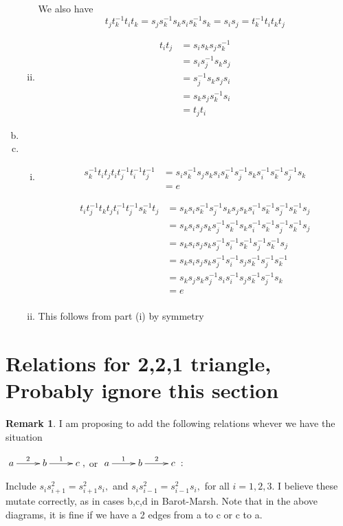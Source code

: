 \documentclass[11pt]{amsart}
\theoremstyle{definition}
\newtheorem{rem}[thm]{Remark}
\begin{document}
\begin{enumerate}[a)]
\begin{enumerate}[i)]
We also have
$$t_jt_k^{-1}t_it_k = s_js_k^{-1}s_ks_is_k^{-1}s_k = s_is_j = t_k^{-1}t_it_kt_j$$ 

\item
\begin{align*}
t_it_j &= s_is_ks_js_k^{-1}\\
&= s_is_j^{-1}s_ks_j\\
&= s_j^{-1}s_ks_js_i\\
&= s_ks_js_k^{-1}s_i\\
&= t_jt_i
\end{align*}
\end{enumerate}
\item
\item
\begin{enumerate}[i)]
\item
\begin{align*}
s_k^{-1}t_it_jt_it_j^{-1}t_i^{-1}t_j^{-1} &= s_is_k^{-1}s_js_ks_is_k^{-1}s_j^{-1}s_ks_i^{-1}s_k^{-1}s_j^{-1}s_k\\
&= e
\end{align*}

\begin{align*}
t_it_j^{-1}t_kt_jt_i^{-1}t_j^{-1}s_k^{-1}t_j &= s_ks_is_k^{-1}s_j^{-1}s_ks_js_ks_i^{-1}s_k^{-1}s_j^{-1}s_k^{-1}s_j\\
&= s_ks_is_js_ks_j^{-1}s_k^{-1}s_ks_i^{-1}s_k^{-1}s_j^{-1}s_k^{-1}s_j\\
&= s_ks_is_js_ks_j^{-1}s_i^{-1}s_k^{-1}s_j^{-1}s_k^{-1}s_j\\
&= s_ks_is_js_ks_j^{-1}s_i^{-1}s_js_k^{-1}s_j^{-1}s_k^{-1}\\
&= s_ks_js_ks_j^{-1}s_is_i^{-1}s_js_k^{-1}s_j^{-1}s_k\\
&= e\\
\end{align*}

\item This follows from part (i) by symmetry
\end{enumerate}
\end{enumerate}


\section{Relations for 2,2,1 triangle, Probably ignore this section}

\begin{rem}
\label{even_more_relations}
I am proposing to add the following relations whever we have the situation

$\xymatrix{a \ar[r]^2 & b \ar[r]^1 & c},$ or $\xymatrix{a \ar[r]^1 & b \ar[r]^2 & c}:$

Include $s_is_{i+1}^2 = s_{i+1}^2s_i,$ and $s_is_{i-1}^2 = s_{i-1}^2s_i,$ for all $i = 1,2,3.$ I believe these mutate correctly, as in cases b,c,d in Barot-Marsh. Note that in the above diagrams, it is fine if we have a 2 edges from a to c or c to a.
\end{rem}
\end{document}
